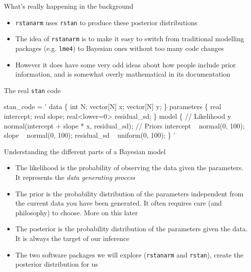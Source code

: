 \documentclass[ignorenonframetext,]{beamer}
\newenvironment{Shaded}{\begin{snugshade}}{\end{snugshade}}
\newcommand{\StringTok}[1]{\textcolor[rgb]{0.31,0.60,0.02}{#1}}
\newcommand{\NormalTok}[1]{#1}
\providecommand{\tightlist}{%
  \setlength{\itemsep}{0pt}\setlength{\parskip}{0pt}}
\begin{document}
\begin{frame}[fragile]{What's really happening in the background}

\begin{itemize}
\tightlist
\item
  \texttt{rstanarm} uses \texttt{rstan} to produce these posterior
  distributions
\item
  The idea of \texttt{rstanarm} is to make it easy to switch from
  traditional modelling packages (e.g. \texttt{lme4}) to Bayesian ones
  without too many code changes
\item
  However it does have some very odd ideas about how people include
  prior information, and is somewhat overly mathematical in its
  documentation
\end{itemize}

\end{frame}

\begin{frame}[fragile]{The real \texttt{stan} code}

\scriptsize

\begin{Shaded}
\begin{Highlighting}[]
\NormalTok{stan_code =}\StringTok{ '}
\StringTok{data \{}
\StringTok{  int N;}
\StringTok{  vector[N] x;}
\StringTok{  vector[N] y;}
\StringTok{\}}
\StringTok{parameters \{}
\StringTok{  real intercept;}
\StringTok{  real slope;}
\StringTok{  real<lower=0> residual_sd;}
\StringTok{\} }
\StringTok{model \{}
\StringTok{  // Likelihood}
\StringTok{  y ~ normal(intercept + slope * x, residual_sd);}
\StringTok{  // Priors}
\StringTok{  intercept ~ normal(0, 100);}
\StringTok{  slope ~ normal(0, 100);}
\StringTok{  residual_sd ~ uniform(0, 100);}
\StringTok{\}}
\StringTok{'}
\end{Highlighting}
\end{Shaded}

\end{frame}

\begin{frame}[fragile]{Understanding the different parts of a Bayesian
model}

\begin{itemize}
\tightlist
\item
  The likelihood is the probability of observing the data given the
  parameters. It represents the \emph{data generating process}
\item
  The prior is the probability distribution of the parameters
  independent from the current data you have been generated. It often
  requires care (and philosophy) to choose. More on this later
\item
  The posterior is the probability distribution of the parameters given
  the data. It is always the target of our inference
\item
  The two software packages we will explore (\texttt{rstanarm} and
  \texttt{rstan}), create the posterior distribution for us
\end{itemize}

\end{frame}
\end{document}
